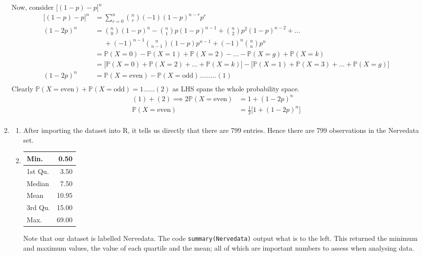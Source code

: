 \documentclass[a4paper]{article}
\newcommand{\p}{\mathbb{P}}
\newcommand{\ds}{\displaystyle}
\newcommand{\code}{\texttt}
\begin{document}
\begin{enumerate}
	Now, consider $\ds{\big[(1-p) - p \big]^n}$
	\begin{align*}
		\big[(1-p) - p \big]^n & = \sum^n_{r=0} \binom{n}{r} (-1)(1-p)^{n-r}p^r \\
		(1-2p)^n & = \binom{n}{0}(1-p)^n - \binom{n}{1}p(1-p)^{n-1} + \binom{n}{2}p^2(1-p)^{n-2} + \dots \\ 
		& \phantom{=} + (-1)^{n-1}\binom{n}{n-1}(1-p)p^{n-1} + (-1)^{n}\binom{n}{n}p^{n} \\
		& = \p(X=0) - \p(X=1) + \p(X=2) - \dots - \p(X=g) + \p(X=k) \\
		& = \big[\p(X=0) + \p(X=2) + \dots + \p(X=k) \big] - \big[\p(X=1) + \p(X=3) + \dots + \p(X=g) \big] \\
		(1-2p)^n & = \p(X=\text{even}) - \p(X=\text{odd})\dots\dots\dots(1) \\
	\end{align*}
	Clearly $\ds{\p(X=\text{even}) + \p(X=\text{odd}) = 1 \dots\dots(2)}$ as LHS spans the whole probability space.
	\begin{align*}
		(1) + (2) \implies 2\p(X=\text{even}) & = 1 + (1-2p)^n \\
		\p(X=\text{even}) & = \frac{1}{2}\Big[1 + (1-2p)^n \Big] \\
	\end{align*}

	\bigbreak

	\item
	\begin{enumerate}

		\item After importing the dataset into R, it tells us directly that there are 799 entries. Hence there are 799 observations in the Nervedata set.

		\bigbreak

		\item 
		\begin{adjustbox}{valign=T,raise=0ex,minipage={\linewidth}}
	        \begin{table}
				\begin{tabular}{l|r}
					Min. & 0.50 \\
					\hline
					1st Qu. & 3.50 \\
					\hline
					Median & 7.50 \\
					\hline
					Mean & 10.95 \\
					\hline
					3rd Qu. & 15.00 \\
					\hline
					Max. & 69.00 \\
				\end{tabular}
			\end{table}
	    	Note that our dataset is labelled Nervedata. The code \code{summary(Nervedata)} output what is to the left. This returned the minimum and maximum values, the value of each quartile and the mean; all of which are important numbers to assess when analysing data. 
	    	\bigbreak
	    	\bigbreak
	    	\bigbreak
	    	\bigbreak
	    \end{adjustbox}


\end{enumerate}
\end{enumerate}
\end{document}
